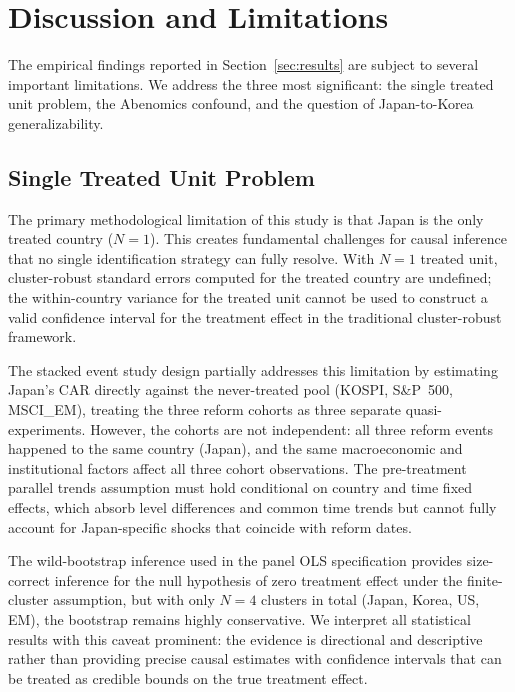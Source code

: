 \documentclass[12pt]{article}
\begin{document}
\section{Discussion and Limitations}
\label{sec:discussion}

The empirical findings reported in Section~\ref{sec:results} are subject to several important
limitations. We address the three most significant: the single treated unit problem, the
Abenomics confound, and the question of Japan-to-Korea generalizability.

\subsection{Single Treated Unit Problem}

The primary methodological limitation of this study is that Japan is the only treated country
($N = 1$). This creates fundamental challenges for causal inference that no single identification
strategy can fully resolve. With $N = 1$ treated unit, cluster-robust standard errors computed
for the treated country are undefined; the within-country variance for the treated unit cannot
be used to construct a valid confidence interval for the treatment effect in the traditional
cluster-robust framework.

The stacked event study design partially addresses this limitation by estimating Japan's CAR
directly against the never-treated pool (KOSPI, S\&P~500, MSCI\_EM), treating the three
reform cohorts as three separate quasi-experiments. However, the cohorts are not independent:
all three reform events happened to the same country (Japan), and the same macroeconomic
and institutional factors affect all three cohort observations. The pre-treatment parallel
trends assumption must hold conditional on country and time fixed effects, which absorb
level differences and common time trends but cannot fully account for Japan-specific shocks
that coincide with reform dates.

The wild-bootstrap inference used in the panel OLS specification \citep{cameron2008} provides
size-correct inference for the null hypothesis of zero treatment effect under the finite-cluster
assumption, but with only $N = 4$ clusters in total (Japan, Korea, US, EM), the bootstrap
remains highly conservative. We interpret all statistical results with this caveat prominent:
the evidence is directional and descriptive rather than providing precise causal estimates
with confidence intervals that can be treated as credible bounds on the true treatment effect.
\end{document}
